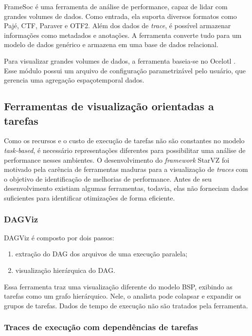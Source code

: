 \documentclass[prop-esp]{iiufrgs}
\begin{document}
FrameSoc \cite{ref:framesoc} é uma ferramenta de análise de performance, capaz de lidar com grandes volumes de dados. Como entrada, ela suporta diversos
formatos como Pajé, CTF, Paraver e OTF2. Além dos dados de \emph{trace}, é possível armazenar informações como metadados e anotações. A ferramenta converte tudo para um modelo de dados genérico e armazena em uma base de dados relacional.

Para visualizar grandes volumes de dados, a ferramenta baseia-se no Ocelotl \cite{ref:ocelotl}. Esse módulo possui um arquivo de configuração parametrizável pelo usuário, que gerencia uma agregação espaçotemporal dados.

\subsection*{Ferramentas de visualização orientadas a tarefas}

Como os recursos e o custo de execução de tarefas não são constantes no modelo \emph{task-based}, é necessário representações diferentes para
possibilitar uma análise de performance nesses ambientes. O desenvolvimento do \emph{framework} StarVZ \cite{ref:starvz} foi motivado pela carência
de ferramentas maduras para a visualização de \emph{traces} com o objetivo de identificação de melhorias de performance. Antes de seu desenvolvimento existiam algumas ferramentas, todavia, elas não forneciam dados suficientes para identificar otimizações de forma eficiente.

\subsubsection*{DAGViz}

DAGViz \cite{ref:dagviz} é composto por dois passos: 

\begin{enumerate}
    \item extração do DAG dos arquivos de uma execução paralela;
    \item visualização hierárquica do DAG.
\end{enumerate}

Essa ferramenta traz uma visualização diferente do modelo BSP, exibindo as tarefas como um grafo hierárquico. Nele, o analista pode colapsar e expandir os grupos de tarefas. Dados de tempo de execução não são tratados pela ferramenta.

\subsubsection*{Traces de execução com dependências de tarefas}
\end{document}
